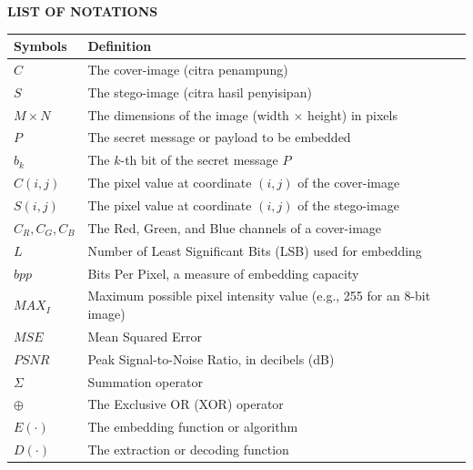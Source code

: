 \begin{center}  
\normalfont\LARGE\textbf{LIST OF NOTATIONS}
\end{center}
\begin{longtable}{|p{2.5cm}|p{11.5cm}|}
	\hline
	\rowcolor{orange!25}\textbf{Symbols} & \textbf{Definition}\\
	\hline \endhead \hline
	$C$ & The cover-image (citra penampung) \\ \hline
	$S$ & The stego-image (citra hasil penyisipan) \\ \hline
	$M \times N$ & The dimensions of the image (width $\times$ height) in pixels \\ \hline
	$P$ & The secret message or payload to be embedded \\ \hline
	$b_k$ & The $k$-th bit of the secret message $P$ \\ \hline
	$C(i,j)$ & The pixel value at coordinate $(i,j)$ of the cover-image \\ \hline
	$S(i,j)$ & The pixel value at coordinate $(i,j)$ of the stego-image \\ \hline
	$C_R, C_G, C_B$ & The Red, Green, and Blue channels of a cover-image \\ \hline
	$L$ & Number of Least Significant Bits (LSB) used for embedding \\ \hline
	$bpp$ & Bits Per Pixel, a measure of embedding capacity \\ \hline
	$MAX_I$ & Maximum possible pixel intensity value (e.g., 255 for an 8-bit image) \\ \hline
	$MSE$ & Mean Squared Error \\ \hline
	$PSNR$ & Peak Signal-to-Noise Ratio, in decibels (dB) \\ \hline
	$\Sigma$ & Summation operator \\ \hline
	$\oplus$ & The Exclusive OR (XOR) operator \\ \hline
	$E(\cdot)$ & The embedding function or algorithm \\ \hline
	$D(\cdot)$ & The extraction or decoding function \\ \hline
\end{longtable}

